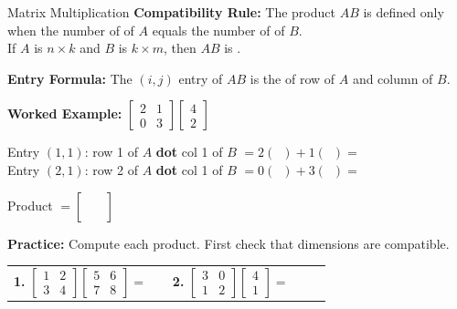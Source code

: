 \documentclass[10pt]{article}
\begin{document}
\begin{notesbox}{Matrix Multiplication}
  \textbf{Compatibility Rule:}
  The product $AB$ is defined only when the number of \blank{2.5cm} of $A$
  equals the number of \blank{2.5cm} of $B$.\\[4pt]
  If $A$ is $n \times k$ and $B$ is $k \times m$, then $AB$ is \blank{2cm}.

  \medskip
  \textbf{Entry Formula:}
  The $(i,j)$ entry of $AB$ is the \blank{3cm} of row \blank{0.8cm} of $A$
  and column \blank{0.8cm} of $B$.

  \medskip
  \textbf{Worked Example:}
  $\begin{bmatrix}2 & 1 \\ 0 & 3\end{bmatrix}\begin{bmatrix}4 \\ 2\end{bmatrix}$

  \medskip
  Entry $(1,1)$: row 1 of $A$ \textbf{dot} col 1 of $B$ $= 2(\phantom{0}) + 1(\phantom{0}) = $ \blank{1.5cm}\\[6pt]
  Entry $(2,1)$: row 2 of $A$ \textbf{dot} col 1 of $B$ $= 0(\phantom{0}) + 3(\phantom{0}) = $ \blank{1.5cm}

  \medskip
  Product $= \begin{bmatrix}\phantom{00} \\ \phantom{00}\end{bmatrix}$
\end{notesbox}

\vspace{0.06in}

\begin{practicebox}
  \textbf{Practice:} Compute each product. First check that dimensions are compatible.

  \medskip
  \begin{tabular}{@{}p{0.46\linewidth}p{0.46\linewidth}@{}}
    \textbf{1.}\quad
    $\begin{bmatrix}1 & 2 \\ 3 & 4\end{bmatrix}
     \begin{bmatrix}5 & 6 \\ 7 & 8\end{bmatrix} = $
    \vspace{1.5in}
    &
    \textbf{2.}\quad
    $\begin{bmatrix}3 & 0 \\ 1 & 2\end{bmatrix}
     \begin{bmatrix}4 \\ 1\end{bmatrix} = $
    \vspace{1.5in}
  \end{tabular}
\end{practicebox}
\end{document}
